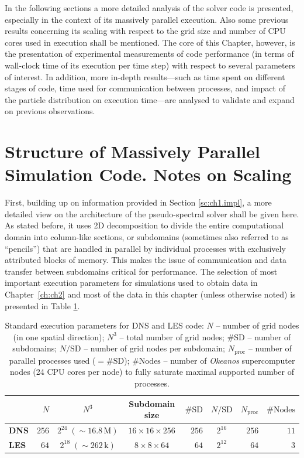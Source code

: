\documentclass{pracamgren}
\begin{document}
In the following sections a more detailed analysis of the solver code is presented, especially in the context of its massively parallel execution.
Also some previous results concerning its scaling with respect to the grid size and number of CPU cores used in execution shall be mentioned.
The core of this Chapter, however, is the presentation of experimental measurements of code performance (in terms of wall-clock time of its execution per time step) with respect to several parameters of interest.
In addition, more in-depth results---such as time spent on different stages of code, time used for communication between processes, and impact of the particle distribution on execution time---are analysed to validate and expand on previous observations.



\section{Structure of Massively Parallel Simulation Code. Notes on Scaling}
\label{sc:ch3.perf}

First, building up on information provided in Section \ref{sc:ch1.impl}, a more detailed view on the architecture of the pseudo-spectral solver shall be given here.
As stated before, it uses 2D decomposition to divide the entire computational domain into column-like sections, or subdomains (sometimes also referred to as ``pencils'') that are handled in parallel by individual processes with exclusively attributed blocks of memory.
This makes the issue of communication and data transfer between subdomains critical for performance.
The selection of most important execution parameters for simulations used to obtain data in Chapter~\ref{ch:ch2} and most of the data in this chapter (unless otherwise noted) is presented in Table \ref{tab:perfs-params}.

\begin{table}[h]
\centering
\scriptsize
\begin{tabular}{lrccrcrr}
 & $N$ & $N^3$ & Subdomain size & $\#\text{SD}$ & $N / \text{SD}$ & $N_{\text{proc}}$ & $\# \text{Nodes}$ \\ \hline
\textbf{DNS} & $256$ & $2^{24} \; (\sim 16.8 \, \text{M})$ & $16 \times 16 \times 256$ & $256$ & $2^{16}$ & $256$ & $11$ \\
\textbf{LES} & $64$ & $2^{18} \; (\sim 262 \, \text{k})$ & $8 \times 8 \times 64$ & $64$ & $2^{12}$ & $64$ & $3$ \\   
\end{tabular}
\caption{Standard execution parameters for DNS and LES code: $N$ -- number of grid nodes (in one spatial direction); $N^3$ -- total number of grid nodes; $\#\text{SD}$ -- number of subdomains; $N / \text{SD}$ -- number of grid nodes per subdomain; $N_{\text{proc}}$ -- number of parallel processes used ($= \#\text{SD}$); $\# \text{Nodes}$ -- number of \emph{Okeanos} supercomputer nodes (24 CPU cores per node) to fully saturate maximal supported number of processes.
}
\label{tab:perfs-params}
\end{table}
\end{document}
